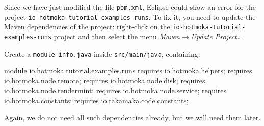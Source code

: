 Since we have just modified the file \texttt{pom.xml}, Eclipse could show an error
for the project \texttt{io-hotmoka-tutorial-examples-runs}. To fix it,
you need to update the Maven dependencies of the project:
right-click on the \texttt{io-hotmoka-tutorial-examples-runs} project
and then select the menu \emph{Maven}$\rightarrow$\emph{Update Project\ldots}

Create a \texttt{module-info.java} inside \texttt{src/main/java}, containing:
%
\begin{codebox}\begin{javalst}
module io.hotmoka.tutorial.examples.runs {
  requires io.hotmoka.helpers;
  requires io.hotmoka.node.remote;
  requires io.hotmoka.node.disk;
  requires io.hotmoka.node.tendermint;
  requires io.hotmoka.node.service;
  requires io.hotmoka.constants;
  requires io.takamaka.code.constants;
}
\end{javalst}\end{codebox}
%
Again, we do not need all such dependencies already, but we will need them later.

